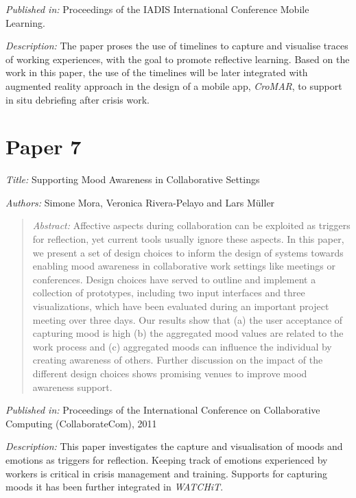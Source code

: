 \emph{Published in: }Proceedings of the IADIS International Conference Mobile Learning. 

\emph{Description: }The paper proses the use of timelines to capture and visualise traces of working experiences, with the goal to promote reflective learning. Based on the work in this paper, the use of the timelines will be later integrated with augmented reality approach in the design of a mobile app, \emph{CroMAR}, to support in situ debriefing after crisis work.

\section*{Paper 7}

\emph{Title: }Supporting Mood Awareness in Collaborative Settings

\emph{Authors: }Simone Mora, Veronica Rivera-Pelayo and Lars Müller

\begin{quote}
	\emph{Abstract: }Affective aspects during collaboration can be exploited as triggers for reflection, yet current tools usually ignore these aspects. In this paper, we present a set of design choices to inform the design of systems towards enabling mood awareness in collaborative work settings like meetings or conferences. Design choices have served to outline and implement a collection of prototypes, including two input interfaces and three visualizations, which have been evaluated during an important project meeting over three days. Our results show that (a) the user acceptance of capturing mood is high (b) the aggregated mood values are related to the work process and (c) aggregated moods can influence the individual by creating awareness of others. Further discussion on the impact of the different design choices shows promising venues to improve mood awareness support.
	
\end{quote}

\emph{Published in: }Proceedings of the International Conference on Collaborative Computing (CollaborateCom), 2011

\emph{Description: }This paper investigates the capture and visualisation of moods and emotions as triggers for reflection. Keeping track of emotions experienced by workers is critical in crisis management and training. Supports for capturing moods it has been further integrated in \emph{WATCHiT}.

